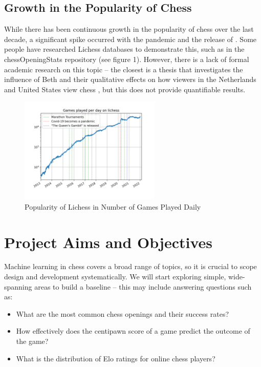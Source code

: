 \documentclass[%
 superscriptaddress,
showpacs,preprintnumbers,
 amsmath,
 amssymb,
 aps,
 pra,
showkeys,
onecolumn,
notitlepage,
11pt,
tightenlines      %
]{revtex4-1}
\begin{document}
\subsection{Growth in the Popularity of Chess}
While there has been continuous growth in the popularity of chess over the last decade, a significant spike occurred with the pandemic and the release of . Some people have researched Lichess databases to demonstrate this, such as in the chessOpeningStats repository (see figure 1). However, there is a lack of formal academic research on this topic -- the closest is a thesis that investigates the influence of Beth and their qualitative effects on how viewers in the Netherlands and United States view chess \cite{lowie2021big}, but this does not provide quantifiable results.

\begin{figure}[h]
    \caption{Popularity of Lichess in Number of Games Played Daily \cite{chessOpeningStats}}
    \begin{center}
    \includegraphics[width=0.6\textwidth]{images/Lichess Number of Games Played Per Day.png}
    \end{center}
\end{figure}

\section{Project Aims and Objectives}
Machine learning in chess covers a broad range of topics, so it is crucial to scope design and development systematically. We will start exploring simple, wide-spanning areas to build a baseline -- this may include answering questions such as:

\begin{itemize}
    \setlength\itemsep{-0.5em}
    \item What are the most common chess openings and their success rates?
    \item How effectively does the centipawn score of a game predict the outcome of the game?
    \item What is the distribution of Elo ratings for online chess players?
\end{itemize}
\end{document}
